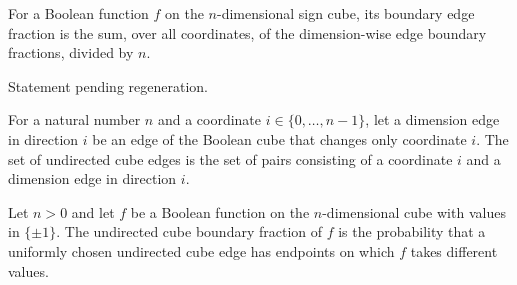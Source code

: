 \begin{definition}
\label{FABL.boundaryEdgeFraction}
\leanok
{}
For a Boolean function $f$ on the $n$-dimensional sign cube, its boundary edge fraction
is the sum, over all coordinates, of the dimension-wise edge boundary fractions, divided
by $n$.
\end{definition}

\begin{theorem}
\label{FABL.boundaryEdgeFraction_eq_totalInfluence_div}
\leanok
{}
Statement pending regeneration.
\end{theorem}

\begin{definition}
\label{FABL.UndirectedCubeEdge}
\leanok
{}
For a natural number $n$ and a coordinate $i\in\{0,\ldots,n-1\}$, let a dimension edge
in direction $i$ be an edge of the Boolean cube that changes only coordinate $i$. The
set of undirected cube edges is the set of pairs consisting of a coordinate $i$ and a
dimension edge in direction $i$.
\end{definition}

\begin{definition}
\label{FABL.undirectedCubeBoundaryFraction}
\leanok
{}
Let $n>0$ and let $f$ be a Boolean function on the $n$-dimensional cube with values in
$\{\pm1\}$. The undirected cube boundary fraction of $f$ is the probability that a
uniformly chosen undirected cube edge has endpoints on which $f$ takes different values.
\end{definition}

